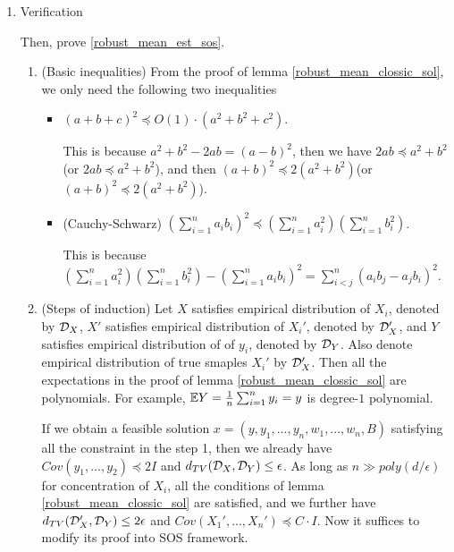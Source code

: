 {\begin{enumerate}
    Similarly, the objects of the problem become $p(x)=O(\epsilon)-\|y-\mu\|_2^2\ge 0$. Therefore the statement is
    \begin{equation}
        \label{robust_mean_est_sos}
        p_1(x)\ge 0,...,p_m(x)\ge 0 \vdash p(x)\ge 0~~~~~\text{or}~~~~~~\mc A\vdash p(x)\ge 0.
    \end{equation}

    \item Verification
    
    Then, prove \eqref{robust_mean_est_sos}.
    \begin{enumerate}
        \item (Basic inequalities) From the proof of lemma \ref{robust_mean_clossic_sol}, we only need the following two inequalities
        \begin{itemize}
            \item $(a+b+c)^2\preccurlyeq O(1)\cdot (a^2+b^2+c^2)$. 
            
            This is because $a^2+b^2-2ab=(a-b)^2$, then we have $2ab\preccurlyeq a^2+b^2$(or $2ab\preccurlyeq a^2+b^2$), and then $(a+b)^2\preccurlyeq 2(a^2+b^2)$(or $(a+b)^2\preccurlyeq 2(a^2+b^2)$).
            
            \item (Cauchy-Schwarz) $\left(\sum_{i=1}^n a_i b_i \right)^2\preccurlyeq \left(\sum_{i=1}^n a_i^2\right) \left(\sum_{i=1}^n b_i^2\right)$.
            
            This is because $\left(\sum_{i=1}^n a_i^2\right) \left(\sum_{i=1}^n b_i^2\right) - \left(\sum_{i=1}^n a_i b_i \right)^2 = \sum_{i<j}^n(a_ib_j - a_jb_i)^2$.

        \end{itemize}
        
        \item (Steps of induction) Let $X$ satisfies empirical distribution of $X_i$, denoted by $\mathcal{D}_X$, $X'$ satisfies empirical distribution of $X_i'$, denoted by $\mathcal{D}_X'$, and $Y$ satisfies empirical distribution of of $y_i$, denoted by $\mathcal{D}_Y$. Also denote empirical distribution of true smaples $X_i'$ by $\mathcal{D}_X'$. Then all the expectations in the proof of lemma \ref{robust_mean_clossic_sol} are polynomials.
        For example, $\mathbb{E}Y= \frac{1}{n}\sum_{i=1}^n y_i=y$ is degree-$1$ polynomial.

        If we obtain a feasible solution $x=(y,y_1,...,y_n,w_1,...,w_n,B)$ satisfying all the constraint in the step 1, then we already have $Cov(y_1,...,y_2)\preccurlyeq 2I$  and  $d_{TV}(\mathcal{D}_X,\mathcal{D}_Y)\le \epsilon$. As long as $n\gg poly(d/\epsilon)$ for concentration of $X_i$, all the conditions of lemma \ref{robust_mean_clossic_sol} are satisfied,
        and we further have $d_{TV}(\mathcal{D}_X',\mathcal{D}_Y)\le 2\epsilon$ and $Cov(X_1',...,X_n')\preccurlyeq C\cdot I$. Now it suffices to modify its proof into SOS framework. 
        

\end{enumerate}
\end{enumerate}}
